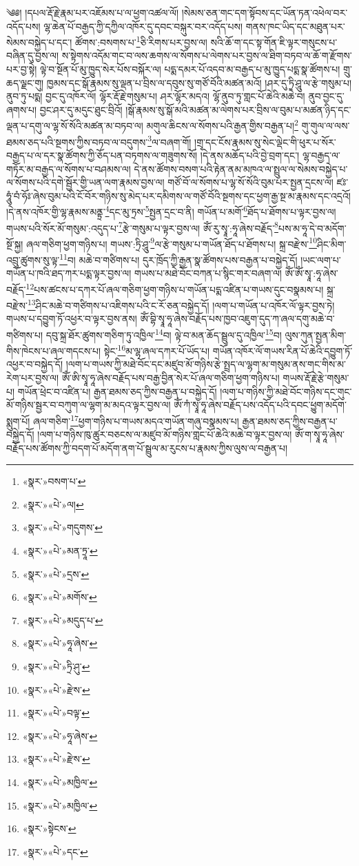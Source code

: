 ༄༅། །དཔལ་རྡོ་རྗེ་རྣམ་པར་འཇོམས་པ་ལ་ཕྱག་འཚལ་ལོ། །སེམས་ཅན་གང་དག་སྟོབས་དང་ཡོན་ཏན་འཕེལ་བར་འདོད་པས། ལྷ་ཆེན་པོ་བརྒྱད་ཀྱི་དཀྱིལ་འཁོར་དུ་དབང་བསྐུར་བར་འདོད་པས། གནས་ཁང་ཡིད་དང་མཐུན་པར་སེམས་བསྐྱེད་པ་དང་། ཚོགས་:བསགས་པ་\footnote{«སྣར་»བསག་པ་}ཅི་རིགས་པར་བྱས་ལ། སའི་ཆོ་ག་དང་སྟ་གོན་ཇི་ལྟར་གསུངས་པ་བཞིན་དུ་བྱས་ལ། ས་སྟེགས་འདོམ་གང་བ་ལས་ཆགས་ལ་སོགས་པ་ལེགས་པར་བྱས་ལ་ཐིག་བཏབ་ལ་ཆོ་ག་རྫོགས་པར་བྱ་སྟེ། ལྟེ་བ་སྔོན་པོ་མུ་ཁྱུད་སེར་པོས་བསྐོར་ལ། པདྨ་དམར་པོ་འདབ་མ་བརྒྱད་པ་མུ་ཁྱུད་པདྨ་སྣ་ཚོགས་པ། གྲུ་ཆད་ལྗང་གུ། ཁྱམས་དང་སྒོ་རྣམས་སུ་ལྡན་པ་བྲིས་ལ་དབུས་སུ་གཙོ་བོའི་མཚན་མའོ། །ཤར་དུ་ཏྲི་ཤཱུ་ལ་རྩེ་གསུམ་པ། ནུབ་ཏུ་པདྨ། བྱང་དུ་འཁོར་ལོ། ལྷོར་རྡོ་རྗེ་གསུམ་པ། ཤར་ལྷོར་མདའ། ལྷོ་ནུབ་ཏུ་གླང་པོ་ཆེའི་མཆེ་བ། ནུབ་བྱང་དུ་ཞགས་པ། བྱང་ཤར་དུ་མདུང་ཐུང་བྲིའོ། །སྒོ་རྣམས་སུ་སྒོ་མའི་མཚན་མ་ལེགས་པར་བྲིས་ལ་བུམ་པ་མཚན་ཉིད་དང་ལྡན་པ་དགུ་ལ་ལྷ་སོ་སོའི་མཚན་མ་བཏབ་ལ། མགུལ་ཆིངས་ལ་སོགས་པའི་རྒྱན་གྱིས་བརྒྱན་པ།\footnote{«སྣར་»«པེ་»ལ།} གུ་གུལ་ལ་ལས་ཐམས་ཅད་པའི་སྔགས་ཀྱིས་བཏབ་ལ་བདུགས་\footnote{«སྣར་»«པེ་»གདུགས་}ལ་བཞག་གོ། །གྲྭ་དང་ངོས་རྣམས་སུ་སེང་ལྡེང་གི་ཕུར་པ་སོར་བརྒྱད་པ་ལ་དར་སྣ་ཚོགས་ཀྱི་ཅོད་པན་བཏགས་ལ་གཟུགས་སོ། །དེ་ནས་མཆོད་པའི་བྱེ་བྲག་དང་། ལྷ་བརྒྱད་ལ་གཏོར་མ་བརྒྱད་ལ་སོགས་པ་བཤམས་ལ། དེ་ནས་ཚོགས་བསག་པའི་རྟེན་ནམ་མཁའ་ལ་སྤྲུལ་ལ་སེམས་བསྐྱེད་པ་ལ་སོགས་པའི་དགེ་སྦྱོར་གྱི་ཡན་ལག་རྣམས་བྱས་ལ། གཙོ་བོ་ལ་སོགས་པ་ལྷ་སོ་སོའི་བུམ་པར་སྤྱན་དྲངས་ལ། ཛཿ་ཧཱུཾ་བཾ་ཧོཿ་ཞེས་བུམ་པའི་ངོ་བོར་གཉིས་སུ་མེད་པར་དམིགས་ལ་གཙོ་བོའི་སྔགས་དང་ཕྱག་རྒྱ་སྔ་མ་རྣམས་དང་འདྲའོ། །དེ་ནས་འཁོར་གྱི་ལྷ་རྣམས་མནྟྲ་\footnote{«སྣར་»«པེ་»མན་ཏྲཱ་}དང་མུ་ཏྲས་\footnote{«སྣར་»«པེ་»དྲས་}སྤྱན་དྲང་བ་ནི། གཡོན་པ་མགོ་\footnote{«སྣར་»«པེ་»མགོས་}ཐོད་པ་ཐོགས་པ་ལྟར་བྱས་ལ། གཡས་པའི་སོར་མོ་གསུམ་:འདུད་པ་\footnote{«སྣར་»«པེ་»མདུད་པ་}རྩེ་གསུམ་པ་ལྟར་བྱས་ལ། ཨོཾ་རུ་སྭཱ་:ཧཱ་ཞེས་བརྗོད་\footnote{«སྣར་»«པེ་»ཧཱ་ཞེས་}པས་མ་ཧཱ་དེ་བ་མདོག་སྔོ་སྐྱ། ཞལ་གཅིག་ཕྱག་གཉིས་པ། གཡས་:ཏྲི་ཤཱུ་\footnote{«སྣར་»«པེ་»ཏྲི་ཤུ་}ལ་རྩེ་གསུམ་པ་གཡོན་ཐོད་པ་ཐོགས་པ། སྐྲ་བརྫེས་\footnote{«སྣར་»«པེ་»རྫེས་}ཤིང་མིག་འབྲུ་ཚུགས་སུ་ལྟ་\footnote{«སྣར་»«པེ་»བལྟ་}བ། མཆེ་བ་གཙིགས་པ། དུར་ཁྲོད་ཀྱི་རྒྱན་སྣ་ཚོགས་པས་བརྒྱན་པ་བསྐྱེད་དོ། །ཡང་ལག་པ་གཡོན་པ་ཁའི་ཐད་ཀར་པདྨ་ལྟར་བྱས་ལ། གཡས་པ་མཐེ་བོང་བཀན་པ་སྙིང་གར་བཞག་ལ། ཨོཾ་ཨོཾ་སྭཱ་:ཧཱ་ཞེས་བརྗོད་\footnote{«སྣར་»«པེ་»ཧཱ་ཞེས་}པས་ཚངས་པ་དཀར་པོ་ཞལ་གཅིག་ཕྱག་གཉིས་པ་གཡོན་པདྨ་འཛིན་པ་གཡས་དུང་བསྣམས་པ། སྐྲ་བརྫེས་\footnote{«སྣར་»«པེ་»རྫེས་}ཤིང་མཆེ་བ་གཙིགས་པ་འཇིགས་པའི་ང་རོ་ཅན་བསྐྱེད་དོ། །ལག་པ་གཡོན་པ་འཁོར་ལོ་ལྟར་བྱས་ཏེ། གཡས་པ་དབྱུག་ཏོ་འཕྱར་བ་ལྟར་བྱས་ནས། ཨོཾ་བྷི་སྭཱ་ཧཱ་ཞེས་བརྗོད་པས་ཁྱབ་འཇུག་དུད་ཀ་ཞལ་དགུ་མཆེ་བ་གཙིགས་པ། དབུ་སྐྲ་ཐོར་ཚུགས་གཅིག་ཏུ་འཁྱིལ་\footnote{«སྣར་»«པེ་»མཁྱིལ་}བ། ལྟེ་བ་མན་ཆོད་སྦྲུལ་དུ་འཁྱིལ་\footnote{«སྣར་»«པེ་»མཁྱིལ་}བ། ལུས་ཀུན་སྤྱན་མིག་གིས་ཁེངས་པ་ཞལ་གདངས་པ། སྟེང་\footnote{«སྣར་»སྟེངས་}མ་ལྷ་ཞལ་དཀར་པོ་ཡོད་པ། གཡོན་འཁོར་ལོ་གཡས་རིན་པོ་ཆེའི་དབྱུག་ཏོ་འཕྱར་བ་བསྐྱེད་དོ། །ལག་པ་གཡས་ཀྱི་མཐེ་བོང་དང་མཛུབ་མོ་གཉིས་རྩེ་སྤྲད་ལ་ལྷག་མ་གསུམ་ནས་གང་གིས་མ་རེག་པར་བྱས་ལ། ཨོཾ་ཨི་སྭཱ་ཧཱ་ཞེས་བརྗོད་པས་བརྒྱ་བྱིན་སེར་པོ་ཞལ་གཅིག་ཕྱག་གཉིས་པ། གཡས་རྡོ་རྗེ་རྩེ་གསུམ་པ། གཡོན་ཕྲེང་བ་འཛིན་པ། རྒྱན་ཐམས་ཅད་ཀྱིས་བརྒྱན་པ་བསྐྱེད་དོ། །ལག་པ་གཉིས་ཀྱི་མཐེ་བོང་གཉིས་དང་གུང་མོ་གཉིས་སྦྱར་བ་བཀུག་ལ་ལྷག་མ་མདའ་ལྟར་བྱས་ལ། ཨོཾ་ཀཾ་སྭཱ་ཧཱ་ཞེས་བརྗོད་པས་འདོད་པའི་དབང་ཕྱུག་མདོག་སྨུག་པོ། ཞལ་གཅིག་\footnote{«སྣར་»«པེ་»དང་}ཕྱག་གཉིས་པ་གཡས་མདའ་གཡོན་གཞུ་བསྣམས་པ། རྒྱན་ཐམས་ཅད་ཀྱིས་བརྒྱན་པ་བསྐྱེད་དོ། །ལག་པ་གཉིས་ཁུ་ཚུར་བཅངས་ལ་མཛུབ་མོ་གཉིས་གླང་པོ་ཆེའི་མཆེ་བ་ལྟར་བྱས་ལ། ཨོཾ་ག་སྭཱ་ཧཱ་ཞེས་བརྗོད་པས་ཚོགས་ཀྱི་བདག་པོ་མདོག་ནག་པོ་སྦྲུལ་མ་རུངས་པ་རྣམས་ཀྱིས་ལུས་ལ་བརྒྱན་པ། 